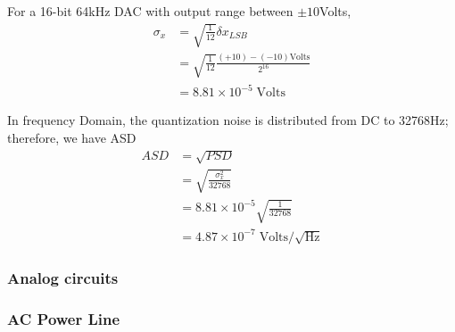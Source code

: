 For a 16-bit 64kHz DAC with output range between $\pm 10$Volts, 
\begin{align}
    \sigma_x &= \sqrt{\frac{1}{12}} \delta x_{LSB} \\
             &= \sqrt{\frac{1}{12}} \frac{(+10)-(-10) \mathrm{Volts}}{2^{16}} \\
             &= 8.81 \times 10^{-5} \;\mathrm{Volts}
\end{align}

In frequency Domain, the quantization noise is distributed from DC to 32768Hz; therefore, we have ASD
\begin{align}
    ASD &= \sqrt{PSD} \\
        &= \sqrt{ \frac{\sigma_x^2}{32768} } \\
        &= 8.81 \times 10^{-5} \sqrt{\frac{1}{32768}} \\
        &= 4.87 \times 10^{-7} \;\mathrm{Volts}/\sqrt{\mathrm{Hz}} 
\end{align}

\subsubsection{Analog circuits}


\subsubsection{AC Power Line}


